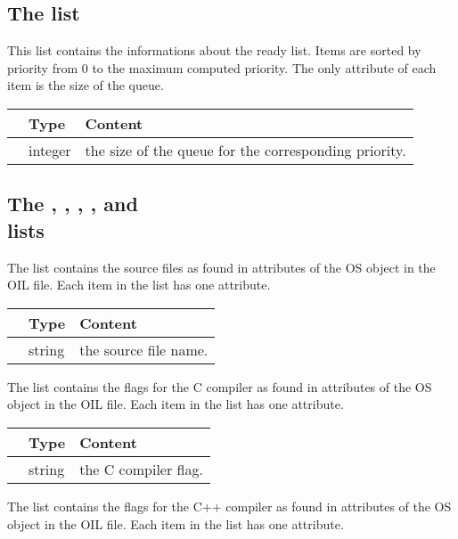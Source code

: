 \subsection{The  list}

This list contains the informations about the ready list. Items are sorted by priority from 0 to the maximum computed priority. The only attribute of each item is the size of the queue.

\begin{longtable}{>{\mem}l|l|p{4.525in}}
{\bf Item}&{\bf Type}&{\bf Content}\\
\hline\endhead
 {SIZE}&
  {integer}&
  {the size of the queue for the corresponding priority.}\\
\end{longtable}

\subsection{The , , , ,  and\\  lists}

The  list contains the source files as found in attributes  of the OS object in the OIL file. Each item in the list has one attribute.

\begin{longtable}{>{\mem}l|l|p{4.6in}}
{\bf Item}&{\bf Type}&{\bf Content}\\
\hline\endhead
 {FILE}&
  {string}&
  {the source file name.}\\
\end{longtable}

The  list contains the flags for the C compiler as found in attributes  of the OS object in the OIL file. Each item in the list has one attribute.

\begin{longtable}{>{\mem}l|l|p{4.575in}}
{\bf Item}&{\bf Type}&{\bf Content}\\
\hline\endhead
 {CFLAG}&
  {string}&
  {the C compiler flag.}\\
\end{longtable}

The  list contains the flags for the C++ compiler as found in attributes  of the OS object in the OIL file. Each item in the list has one attribute.


